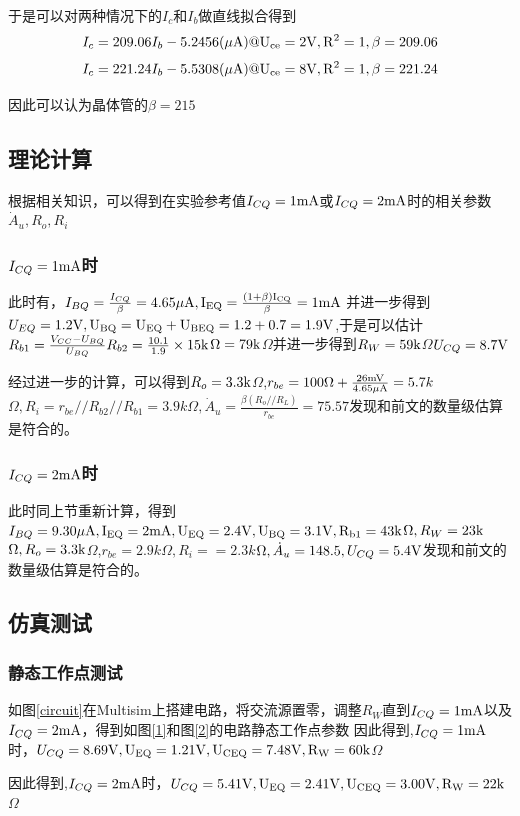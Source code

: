 \documentclass[UTF8,a4paper]{ctexart}
\begin{document}
于是可以对两种情况下的$I_c$和$I_b$做直线拟合得到
$$I_c=209.06I_b-5.2456(\rm{\mu A})@U_{ce}=2\rm{V},R^2=1,\beta=209.06$$
$$I_c=221.24I_b-5.5308(\rm{\mu A})@U_{ce}=8\rm{V},R^2=1,\beta=221.24$$

因此可以认为晶体管的$\beta=215$
\subsection{理论计算}
根据相关知识，可以得到在实验参考值$I_{CQ}=1\rm{mA}$或$I_{CQ}=2\rm{mA}$时的相关参数$\dot{A}_u,R_o,R_i$
\subsubsection{$I_{CQ}=1\rm{mA}$时}
此时有，$I_{BQ}=\frac{I_{CQ}}{\beta}=4.65\rm{\mu A},I_{EQ}=\frac{(1+\beta)I_{CQ}}{\beta}=1\rm{mA}$ 并进一步得到$U_{EQ}=1.2\rm{V},U_{BQ}=U_{EQ}+U_{BEQ}=1.2+0.7=1.9\rm{V}$,于是可以估计$R_{b1}=\frac{V_{CC}-U_{BQ}}{U_{BQ}}R_{b2}=\frac{10.1}{1.9}\times15\rm{k}$$\Omega=79\rm{k}$$\Omega$并进一步得到$R_W=59\rm{k}$$\Omega$$U_{CQ}=8.7\rm{V}$

经过进一步的计算，可以得到$R_o=3.3\rm{k}$$\Omega$,$r_{be}=100\Omega+\frac{26\rm{mV}}{4.65\rm{\mu A}}=5.7k$$\Omega,R_i=r_{be}//R_{b2}//R_{b1}=3.9k$$\Omega,\dot{A}_u=\frac{\beta(R_o//R_L)}{r_{be}}=75.57$发现和前文的数量级估算是符合的。
\subsubsection{$I_{CQ}=2\rm{mA}$时}
此时同上节重新计算，得到$I_{BQ}=9.30\rm{\mu A},I_{EQ}=2\rm{mA},U_{EQ}=2.4\rm{V},U_{BQ}=3.1\rm{V},R_{b1}=43\rm{k}$$\Omega,R_W=23\rm{k}$$\Omega,R_o=3.3\rm{k}$$\Omega$,$r_{be}=2.9k$$\Omega,R_i==2.3k$$\Omega,\dot{A}_u=148.5,U_{CQ}=5.4\rm{V}$发现和前文的数量级估算是符合的。
\subsection{仿真测试}
\subsubsection{静态工作点测试}
如图\ref{circuit}在Multisim上搭建电路，将交流源置零，调整$R_W$直到$I_{CQ}=1\rm{mA}$以及$I_{CQ}=2\rm{mA}$，得到如图\ref{1}和图\ref{2}的电路静态工作点参数
因此得到,$I_{CQ}=1\rm{mA}$时，$U_{CQ}=8.69\rm{V},U_{EQ}=1.21\rm{V},U_{CEQ}=7.48\rm{V},R_W=60k$$\Omega$

因此得到,$I_{CQ}=2\rm{mA}$时，$U_{CQ}=5.41\rm{V},U_{EQ}=2.41\rm{V},U_{CEQ}=3.00\rm{V},R_W=22k$$\Omega$
\end{document}
